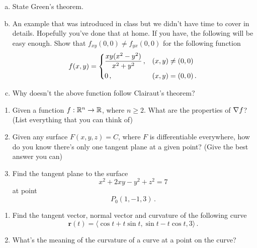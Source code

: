 \documentclass[12pt]{article}
\begin{document}
\newpage
\begin{problem}
    \begin{enumerate}[a.]
        \item State Green's theorem.
        \item An example that was introduced in class but we didn't have 
            time to cover in details. Hopefully you've done that at home.
            If you have, the following will be easy enough.
            Show that $f_{xy}(0,0) \not= f_{yx}(0,0)$ for the following function
            \begin{equation*}
                f(x,y) = 
                \begin{dcases}
                    \frac{xy(x^2 - y^2)}{x^2 + y^2} \,, & (x,y) \not= (0,0) \\
                    0 \,, & (x,y) = (0,0) \,.
                \end{dcases}
            \end{equation*}
        \item Why doesn't the above function follow Clairaut's theorem?
    \end{enumerate}
\end{problem}


\newpage
\begin{problem}
\begin{enumerate}
    \item Given a function $f:\mathbb{R}^n \to \mathbb{R}$, where $n\geq 2$.
        What are the properties of $\nabla f$? (List everything that you can think of)
    \item Given any surface $F(x,y,z) = C$, where $F$ is differentiable everywhere, how do you know there's only one tangent plane at a given point?
        (Give the best answer you can)
    \item Find the tangent plane to the surface
        \begin{equation*}
            x^2 + 2xy - y^2 + z^2 =7 
        \end{equation*}
        at point
        \begin{equation*}
            P_0(1,-1,3) \,.
        \end{equation*}
\end{enumerate}
\end{problem}


\newpage
\begin{problem}
    \begin{enumerate}
        \item Find the tangent vector, normal vector and curvature of the following curve
    \begin{equation*}
        \textbf{r}(t) = \langle \cos t + t \sin t, \sin t - t\cos t, 3 \rangle \,.
    \end{equation*}
    \item What's the meaning of the curvature of a curve at a point on the curve?
    \end{enumerate}

\end{problem}
\end{document}
